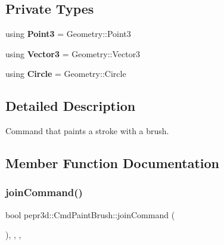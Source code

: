 \subsection*{Private Types}
\begin{DoxyCompactItemize}
\item 
\mbox{\label{classpepr3d_1_1_cmd_paint_brush_a290379a49d9bebc4942c4943afa1b4b7}} 
using {\bfseries Point3} = Geometry\+::\+Point3
\item 
\mbox{\label{classpepr3d_1_1_cmd_paint_brush_a907d867e41dad74e0e62fe7fe66254e1}} 
using {\bfseries Vector3} = Geometry\+::\+Vector3
\item 
\mbox{\label{classpepr3d_1_1_cmd_paint_brush_add56ca85f16c7df09fde483fc2bc4a4e}} 
using {\bfseries Circle} = Geometry\+::\+Circle
\end{DoxyCompactItemize}


\subsection{Detailed Description}
Command that paints a stroke with a brush. 

\subsection{Member Function Documentation}
\mbox{\label{classpepr3d_1_1_cmd_paint_brush_a05e6c87b7cd47b72150e05f2ee584ee8}} 
\subsubsection{\texorpdfstring{joinCommand()}{joinCommand()}}
{\footnotesize\ttfamily bool pepr3d\+::\+Cmd\+Paint\+Brush\+::join\+Command (\begin{DoxyParamCaption}\item[{const \mbox{\hyperlink{classpepr3d_1_1_command_base}{Command\+Base}} \&}]{ }\end{DoxyParamCaption})\hspace{0.3cm}{\ttfamily [inline]}, {\ttfamily [override]}, {\ttfamily [protected]}, {\ttfamily [virtual]}}



